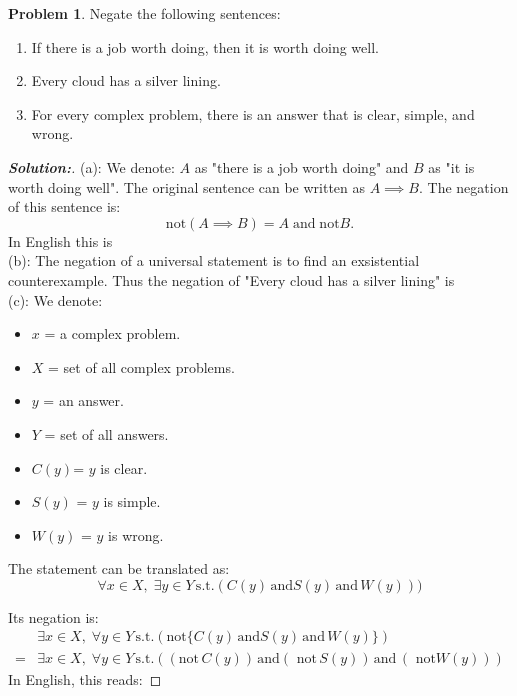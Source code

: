 \documentclass[12pt]{article}
\theoremstyle{definition}\newtheorem{problem}{Problem}
\newenvironment{solution}{\begin{proof}[\bfseries\textup{Solution:}]}{\end{proof}}
\begin{document}
%
\newpage
\begin{problem}
Negate the following sentences:
\begin{enumerate}
\item If there is a job worth doing, then it is worth doing well.
\item Every cloud has a silver lining.
\item For every complex problem, there is an answer that is clear, simple, and wrong.
\end{enumerate}
\end{problem}
\begin{solution}\quad \newline

    (a): We denote: $ A $ as "there is a job worth doing" and $ B $ as "it is worth doing well". The original sentence can be written as $ A \implies B $. The negation of this sentence is: $$ \text{not} (A \implies B) = A \; \text{and} \; \text{not}B.  $$ 
    In English this is 
\\

    (b): The negation of a universal statement is to find an exsistential counterexample. Thus the negation of "Every cloud has a silver lining" is \\

    (c): We denote: \begin{itemize}
        \item  $x$ = a complex problem.
        \item $ X $ = set of all complex problems.
        \item $y$ = an answer.
        \item $ Y $ = set of all answers.
        \item $ C(y) $= $ y $ is clear. 
        \item $S(y)$ = $y$ is simple.
        \item $W(y)$ = $y$ is wrong.
    \end{itemize}
    
The statement can be translated as: 
    $$\forall x \in X , \; \exists y \in Y \, \text{s.t.} (C(y) \, \text{and} S(y) \, \text{and} \, W(y)))$$

Its negation is:
\begin{align}
&\exists x \in X , \; \forall y \in Y \, \text{s.t.}  (\text{not}\{ C(y) \, \text{and} S(y) \, \text{and} \, W(y)\}) \\
= & \exists x \in X , \; \forall y \in Y \, \text{s.t.}  ((\text{not}\, C(y)) \, \text{and} (\text{ not}\, S(y)) \, \text{and} \, (\text{ not} W(y)))
\end{align}
 In English, this reads: 
 


\end{solution}
\end{document}
